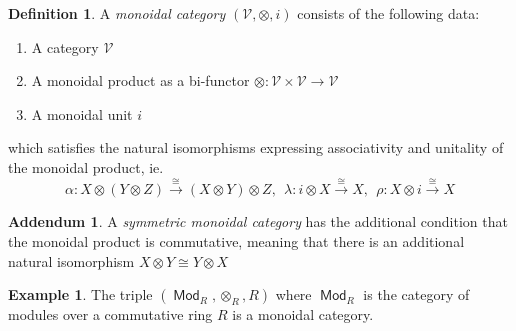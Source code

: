 \documentclass[leqno, openany]{memoir}
\theoremstyle{definition}
\newtheorem{defn}[thm]{Definition}
\newtheorem{exm}[thm]{Example}
\newtheorem{addm}[thm]{Addendum}
\theoremstyle{remark}
\theoremstyle{plain}
\theoremstyle{definition}
\theoremstyle{remark}
\newcommand{\iso}{\cong}
\DeclareMathOperator{\Mod}{\mathsf{Mod}}
\begin{document}
\newpage
\begin{defn} 
    A {\emph{monoidal category}} $(\mathcal{V}, \otimes, i)$ consists of the following data:
    \begin{enumerate}
        \item A category $\mathcal{V}$
        \item A monoidal product as a bi-functor $\otimes: \mathcal{V} \times \mathcal{V} \to \mathcal{V}$
        \item A monoidal unit $i$
    \end{enumerate}
    which satisfies the natural isomorphisms expressing associativity and unitality of the monoidal product, ie. 
    \[\alpha: X \otimes (Y \otimes Z) \xrightarrow{\iso} (X \otimes Y) \otimes Z, \ \ \lambda: i \otimes X \xrightarrow{\iso} X,  \ \ \rho: X \otimes i \xrightarrow{\iso} X\]
\end{defn}

\begin{addm}
    A \emph{symmetric monoidal category} has the additional condition that the monoidal product is commutative, meaning that there is an additional natural isomorphism $X \otimes Y \iso Y \otimes X$
\end{addm}

\begin{exm}
    The triple $(\Mod_R, \otimes_R, R)$ where $\Mod_R$ is the category of modules over a commutative ring $R$ is a monoidal category.
\end{exm}
\end{document}
